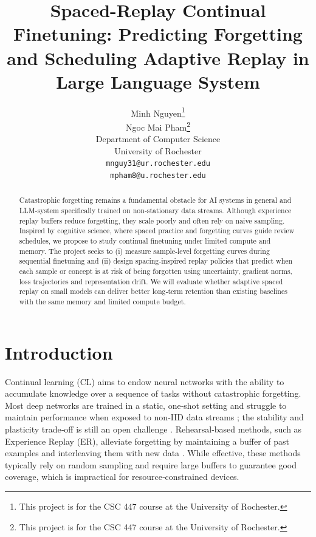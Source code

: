 \documentclass{article}
\title{Spaced-Replay Continual Finetuning: Predicting Forgetting and Scheduling Adaptive Replay in Large Language System}
\author{%
  Minh Nguyen\thanks{This project is for the CSC 447 course at the University of Rochester.}\\
  Ngoc Mai Pham\thanks{This project is for the CSC 447 course at the University of Rochester.} \\
  Department of Computer Science\\
  University of Rochester\\
  \texttt{mnguy31@ur.rochester.edu}\\
  \texttt{mpham8@u.rochester.edu}
}
\begin{document}
\maketitle

\begin{abstract}
Catastrophic forgetting remains a fundamental obstacle for AI systems in general and LLM-system specifically trained on non\mbox{‑}stationary data streams.  Although experience replay buffers reduce forgetting, they scale poorly and often rely on naive sampling.  Inspired by cognitive science, where spaced practice and forgetting curves guide review schedules, we propose to study continual finetuning under limited compute and memory.  The project seeks to (i) measure sample\mbox{‑}level forgetting curves during sequential finetuning and (ii) design spacing\mbox{‑}inspired replay policies that predict when each sample or concept is at risk of being forgotten using uncertainty, gradient norms, loss trajectories and representation drift.  We will evaluate whether adaptive spaced replay on small models can deliver better long\mbox{‑}term retention than existing baselines with the same memory and limited compute budget.
\end{abstract}

\section{Introduction}
\label{sec:intro}

Continual learning (CL) aims to endow neural networks with the ability to accumulate knowledge over a sequence of tasks without catastrophic forgetting.  Most deep networks are trained in a static, one\mbox{‑}shot setting and struggle to maintain performance when exposed to non\mbox{‑}IID data streams \citep{aljundi2019mir}; the stability and plasticity trade\mbox{‑}off is still an open challenge \citep{delange2021survey, wang2024comprehensive, chaudhry2019tiny}.  Rehearsal\mbox{‑}based methods, such as Experience Replay (ER), alleviate forgetting by maintaining a buffer of past examples and interleaving them with new data \citep{chaudhry2019tiny}.  While effective, these methods typically rely on random sampling and require large buffers to guarantee good coverage, which is impractical for resource\mbox{‑}constrained devices.
\end{document}
